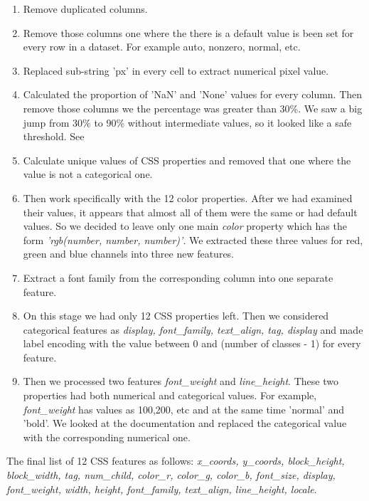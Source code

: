 \begin{enumerate}
    \item Remove duplicated columns.
    \item Remove those columns one where the there is a default value is been set for every row in a dataset. For example auto, nonzero, normal, etc. 
    \item Replaced sub-string 'px' in every cell to extract numerical pixel value.
    \item Calculated the proportion of 'NaN' and 'None' values for every column. Then remove those columns we the percentage was greater than 30\%. We saw a big jump from 30\% to 90\% without intermediate values, so it looked like a safe threshold. See 
    \item Calculate unique values of CSS properties and removed that one where the value is not a categorical one.   
    \item Then work specifically with the 12 color properties. After we had examined their values, it appears that almost all of them were the same or had default values. So we decided to leave only one main \textit{color} property which has the form \textit{'rgb(number, number, number)'}. We extracted these three values for red, green and blue channels into three new features. 
    \item Extract a font family from the corresponding column into one separate feature.
    \item On this stage we had only 12 CSS properties left. Then we considered categorical features as \textit{display, font\_family, text\_align, tag, display} and made label encoding with the value between 0 and (number of classes - 1) for every feature.
    \item Then we processed two features \textit{font\_weight} and \textit{line\_height}. These two properties had both numerical and categorical values. For example, \textit{font\_weight} has values as 100,200, etc and at the same time 'normal' and 'bold'. We looked at the documentation and replaced the categorical value with the corresponding numerical one. 
\end{enumerate}

The final list of 12 CSS features as follows: \textit{x\_coords, y\_coords, block\_height, block\_width, tag, num\_child, color\_r, color\_g, color\_b, font\_size, display, font\_weight, width, height, font\_family, text\_align, line\_height, locale}.\\

